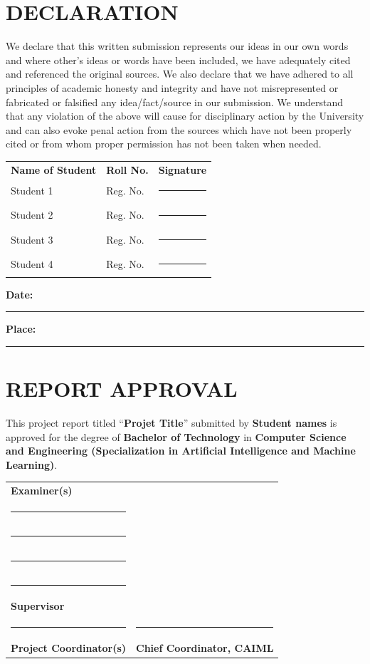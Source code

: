 \documentclass[12pt,a4paper]{report}
\begin{document}
\chapter*{DECLARATION}
We declare that this written submission represents our ideas in our own words and where other’s ideas or words have been included, we have adequately cited and referenced the original sources. We also declare that we have adhered to all principles of academic honesty and integrity and have not misrepresented or fabricated or falsified any idea/fact/source in our submission. We understand that any violation of 
the above will cause for disciplinary action by the University and can also evoke penal action from the sources which have not been properly cited or from whom proper permission has not been taken when needed.
\vspace{1cm}

\begin{center}
\begin{tabular}{p{5.2cm}p{5.8cm}p{3.2cm}}
\textbf{Name of Student} & \textbf{Roll No.} & \textbf{Signature} \\[1em]
Student 1 & Reg. No.& \rule{3.2cm}{0.2pt} \\[1em]
Student 2 & Reg. No.& \rule{3.2cm}{0.2pt} \\[1em]
Student 3 & Reg. No.& \rule{3.2cm}{0.2pt} \\[1em]
Student 4 & Reg. No.& \rule{3.2cm}{0.2pt} \\[1em]
\end{tabular}
\end{center}
\vspace{1cm}
\noindent\textbf{Date:} \rule{5cm}{0.2pt} \hfill \textbf{Place:} \rule{5cm}{0.2pt}



\chapter*{REPORT APPROVAL}

This project report titled “\textbf{Projet Title}” submitted by  \textbf{Student names} is approved for the degree of \textbf{Bachelor of Technology} in \textbf{Computer Science and Engineering (Specialization in Artificial Intelligence and Machine Learning)}.

\vspace{2cm}
\noindent\begin{tabular}{p{9cm} p{7cm}}
\textbf{Examiner(s)} &\\[0.75cm]
\rule{6.2cm}{1pt} & \\[0.75cm]
\rule{6.2cm}{1pt} & \\[0.75cm]
\rule{6.2cm}{1pt} & \\[3cm]
\rule{6.2cm}{1pt} & \\
\textbf{Supervisor} &\\[3cm]
\rule{6.2cm}{1pt} & \rule{6.5cm}{1pt}\\
\textbf{Project Coordinator(s)} &\textbf{Chief Coordinator, CAIML}\\
\end{tabular}
\end{document}
